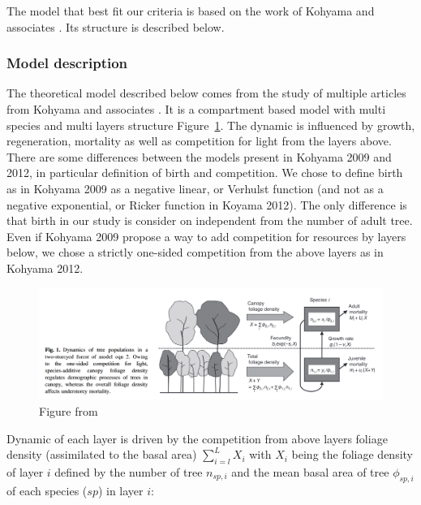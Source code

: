 \documentclass{article}
\begin{document}
The model that best fit our criteria is based on the work of Kohyama and associates \autocite{kohyamaStratificationTheoryPlant2009, kohyamaOnesidedCompetitionLight2012}. Its structure is described below.

\subsubsection{Model description}

The theoretical model described below comes from the study of multiple articles from Kohyama and associates \autocite{kohyamaStratificationTheoryPlant2009, kohyamaOnesidedCompetitionLight2012}.
It is a compartment based model with multi species and multi layers structure Figure~\ref{fig:fig_model}. The dynamic is influenced by growth, regeneration, mortality as well as competition for light from the layers above. There are some differences between the models present in Kohyama 2009 and 2012, in particular definition of birth and competition. We chose to define birth as in Kohyama 2009 as a negative linear, or Verhulst function (and not as a negative exponential, or Ricker function in Koyama 2012). The only difference is that birth in our study is consider on independent from the number of adult tree. Even if Kohyama 2009 propose a way to add competition for resources by layers below, we chose a strictly one-sided competition from the above layers as in Kohyama 2012.

\begin{figure}[h]
    \centering
    \includegraphics[width=\textwidth]{Figure/Fig_model_Kohyama.png}
    \caption{Figure from \autocite{kohyamaOnesidedCompetitionLight2012}}
    \label{fig:fig_model}
\end{figure}

Dynamic of each layer is driven by the competition from above layers foliage density (assimilated to the basal area) $\sum_{i = l}^{L} X_i$ with $X_i$ being the foliage density of layer $i$ defined by the number of tree $n_{sp,i}$ and the mean basal area of tree $\phi_{sp,i}$ of each species ($sp$) in layer $i$:
\end{document}

